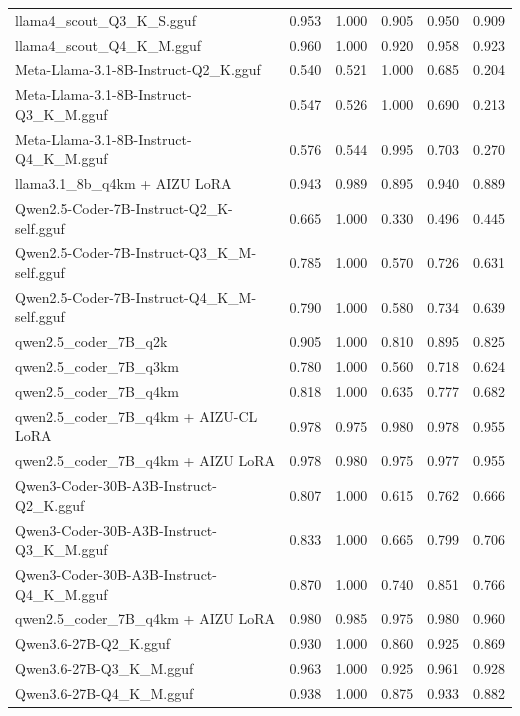 \begin{table}[htbp]
{\begin{tabular}{lrrrrr}
    llama4\_scout\_Q3\_K\_S.gguf & 0.953 & 1.000 & 0.905 & 0.950 & 0.909 \\
    llama4\_scout\_Q4\_K\_M.gguf & 0.960 & 1.000 & 0.920 & 0.958 & 0.923 \\
    Meta-Llama-3.1-8B-Instruct-Q2\_K.gguf & 0.540 & 0.521 & 1.000 & 0.685 & 0.204 \\
    Meta-Llama-3.1-8B-Instruct-Q3\_K\_M.gguf & 0.547 & 0.526 & 1.000 & 0.690 & 0.213 \\
    Meta-Llama-3.1-8B-Instruct-Q4\_K\_M.gguf & 0.576 & 0.544 & 0.995 & 0.703 & 0.270 \\
    llama3.1\_8b\_q4km + AIZU LoRA & 0.943 & 0.989 & 0.895 & 0.940 & 0.889 \\
    Qwen2.5-Coder-7B-Instruct-Q2\_K-self.gguf & 0.665 & 1.000 & 0.330 & 0.496 & 0.445 \\
    Qwen2.5-Coder-7B-Instruct-Q3\_K\_M-self.gguf & 0.785 & 1.000 & 0.570 & 0.726 & 0.631 \\
    Qwen2.5-Coder-7B-Instruct-Q4\_K\_M-self.gguf & 0.790 & 1.000 & 0.580 & 0.734 & 0.639 \\
    qwen2.5\_coder\_7B\_q2k & 0.905 & 1.000 & 0.810 & 0.895 & 0.825 \\
    qwen2.5\_coder\_7B\_q3km & 0.780 & 1.000 & 0.560 & 0.718 & 0.624 \\
    qwen2.5\_coder\_7B\_q4km & 0.818 & 1.000 & 0.635 & 0.777 & 0.682 \\
    qwen2.5\_coder\_7B\_q4km + AIZU-CL LoRA & 0.978 & 0.975 & 0.980 & 0.978 & \cellcolor{green!30}0.955 \\
    qwen2.5\_coder\_7B\_q4km + AIZU LoRA & 0.978 & 0.980 & 0.975 & 0.977 & \cellcolor{green!20}0.955 \\
    Qwen3-Coder-30B-A3B-Instruct-Q2\_K.gguf & 0.807 & 1.000 & 0.615 & 0.762 & 0.666 \\
    Qwen3-Coder-30B-A3B-Instruct-Q3\_K\_M.gguf & 0.833 & 1.000 & 0.665 & 0.799 & 0.706 \\
    Qwen3-Coder-30B-A3B-Instruct-Q4\_K\_M.gguf & 0.870 & 1.000 & 0.740 & 0.851 & 0.766 \\
    qwen2.5\_coder\_7B\_q4km + AIZU LoRA & 0.980 & 0.985 & 0.975 & 0.980 & \cellcolor{green!50}0.960 \\
    Qwen3.6-27B-Q2\_K.gguf & 0.930 & 1.000 & 0.860 & 0.925 & 0.869 \\
    Qwen3.6-27B-Q3\_K\_M.gguf & 0.963 & 1.000 & 0.925 & 0.961 & 0.928 \\
    Qwen3.6-27B-Q4\_K\_M.gguf & 0.938 & 1.000 & 0.875 & 0.933 & 0.882 \\

\end{tabular}}
\end{table}
